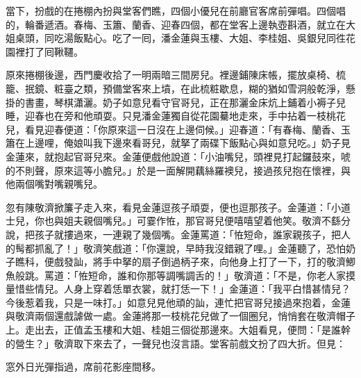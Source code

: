 當下，扮戲的在捲棚內扮與堂客們瞧，四個小優兒在前廳官客席前彈唱。四個唱的，輪番遞酒。春梅、玉簫、蘭香、迎春四個，都在堂客上邊執壺斟酒，就立在大姐桌頭，同吃湯飯點心。吃了一囘，潘金蓮與玉樓、大姐、李桂姐、吳銀兒同徃花園裡打了囘鞦韆。

原來捲棚後邊，西門慶收拾了一明兩暗三間房兒。裡邊鋪陳床帳，擺放桌椅、梳籠、抿鏡、粧臺之類，預備堂客來上墳，在此梳粧歇息，糊的猶如雪洞般乾淨，懸掛的書畫，琴棋瀟灑。奶子如意兒看守官哥兒，正在那灑金床炕上鋪着小褥子兒睡，迎春也在旁和他頑耍。只見潘金蓮獨自從花園驀地走來，手中拈着一枝桃花兒，{}看見迎春便道：「你原來這一日沒在上邊伺候。」迎春道：「有春梅、蘭香、玉簫在上邊哩，俺娘叫我下邊來看哥兒，就拏了兩碟下飯點心與如意兒吃。」奶子見金蓮來，就抱起官哥兒來。金蓮便戲他說道：「小油嘴兒，頭裡見打起鑼鼓來，唬的不則聲，原來這等小膽兒。」於是一面解開藕絲羅襖兒，接過孩兒抱在懷裡，與他兩個嘴對嘴親嘴兒。

忽有陳敬濟掀簾子走入來，看見金蓮逗孩子頑耍，便也逗那孩子。金蓮道：「小道士兒，你也與姐夫親個嘴兒。」可霎作恠，那官哥兒便嘻嘻望着他笑。{}敬濟不繇分說，把孩子就摟過來，一連親了幾個嘴。金蓮罵道：「恠短命，誰家親孩子，把人的髩都抓亂了！」敬濟笑戲道：「你還說，早時我沒錯親了哩。」{}金蓮聽了，恐怕奶子瞧科，便戲發訕，將手中拏的扇子倒過柄子來，向他身上打了一下，打的敬濟鯽魚般跳。罵道：「恠短命，誰和你那等調嘴調舌的！」敬濟道：「不是，你老人家摸量惜些情兒。人身上穿着恁單衣裳，就打恁一下！」金蓮道：「我平白惜甚情兒？今後惹着我，只是一味打。」{}如意兒見他頑的訕，連忙把官哥兒接過來抱着，金蓮與敬濟兩個還戲謔做一處。金蓮將那一枝桃花兒做了一個圈兒，悄悄套在敬濟帽子上。{}走出去，正值孟玉樓和大姐、桂姐三個從那邊來。大姐看見，便問：「是誰幹的營生？」敬濟取下來去了，一聲兒也沒言語。堂客前戲文扮了四大折。但見：

\begin{myquote}
窓外日光彈指過，席前花影座間移。
\end{myquote}

